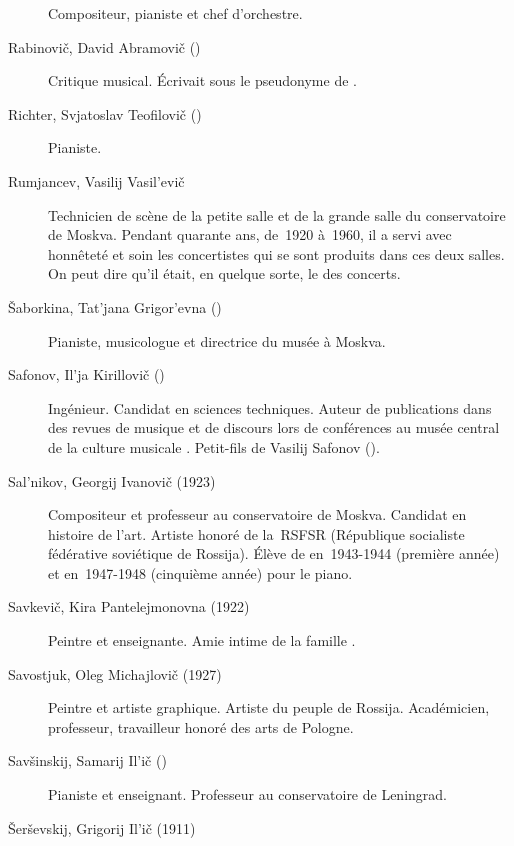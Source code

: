 \begin{description}
 Compositeur, pianiste et chef d'orchestre.
 \item[Rabinovič, David Abramovič (\Dates{1900}{1978})]%
 Critique musical.
 Écrivait sous le pseudonyme de .
 \item[Richter, Svjatoslav Teofilovič (\Dates{1915}{1997})]%
 Pianiste.
 \item[Rumjancev, Vasilij Vasil'evič]%
 Technicien de scène de la petite salle et de la grande salle du
 conservatoire de Moskva.
 Pendant quarante ans, de~1920 à~1960, il a servi avec honnêteté et soin les
 concertistes qui se sont produits dans ces deux salles.
 On peut dire qu'il était, en quelque sorte, le 
 des concerts.
 \item[Šaborkina, Tat'jana Grigor'evna (\Dates{1906}{1986})]%
 Pianiste, musicologue et directrice du musée \Scriabine{} à Moskva.
 \item[Safonov, Il'ja Kirillovič (\Dates{1937}{2004})]%
 Ingénieur.
 Candidat en sciences techniques.
 Auteur de publications dans des revues de musique et de discours lors de
 conférences au musée central de la culture musicale \MGlinka{}.
 Petit-fils de Vasilij Safonov ().
 \item[Sal'nikov, Georgij Ivanovič (1923\dvsborn{})]%
 Compositeur et professeur au conservatoire de Moskva.
 Candidat en histoire de l'art.
 Artiste honoré de la~RSFSR (République socialiste fédérative soviétique de
 Rossija).
 Élève de \VSofronitsky{} en~1943-1944 (première année) et en~1947-1948
 (cinquième année) pour le piano.
 \item[Savkevič, Kira Pantelejmonovna (1922\dvsborn{})]%
 Peintre et enseignante.
 Amie intime de la famille \Sofronitsky{}.
 \item[Savostjuk, Oleg Michajlovič (1927\dvsborn{})]%
 Peintre et artiste graphique.
 Artiste du peuple de Rossija.
 Académicien, professeur, travailleur honoré des arts de Pologne.
 \item[Savšinskij, Samarij Il'ič (\Dates{1891}{1968})]%
 Pianiste et enseignant.
 Professeur au conservatoire de Leningrad.
 \item[Šerševskij, Grigorij Il'ič (1911\dvsborn{})]%

\end{description}
